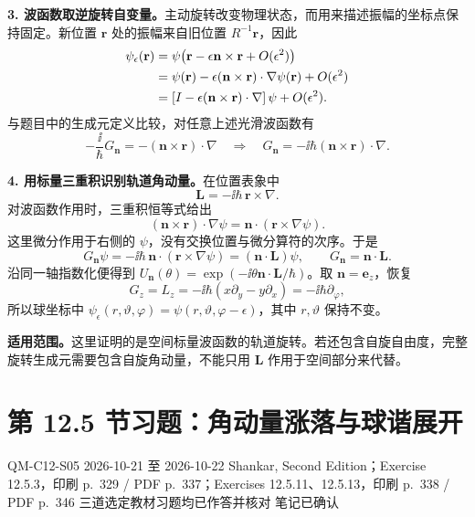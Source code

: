 \begin{checkedsolution}
\textbf{3. 波函数取逆旋转自变量。}主动旋转改变物理状态，而用来描述振幅的坐标点保持固定。新位置 $\mathbf r$ 处的振幅来自旧位置 $R^{-1}\mathbf r$，因此
\begin{align}
  \psi_\epsilon(\mathbf r)
  &=\psi\bigl(\mathbf r-\epsilon\mathbf n\times\mathbf r
      +O(\epsilon^2)\bigr)\notag\\
  &=\psi(\mathbf r)-\epsilon(\mathbf n\times\mathbf r)\cdot
      \nabla\psi(\mathbf r)+O(\epsilon^2)\notag\\
  &=\left[I-\epsilon(\mathbf n\times\mathbf r)\cdot\nabla\right]\psi
      +O(\epsilon^2).
\end{align}
与题目中的生成元定义比较，对任意上述光滑波函数有
\begin{equation}
  -\frac{\ii}{\hbar}G_{\mathbf n}
   =-(\mathbf n\times\mathbf r)\cdot\nabla
  \quad\Longrightarrow\quad
  G_{\mathbf n}=-\ii\hbar(\mathbf n\times\mathbf r)\cdot\nabla.
\end{equation}

\textbf{4. 用标量三重积识别轨道角动量。}在位置表象中
\begin{equation}
  \mathbf L=-\ii\hbar\,\mathbf r\times\nabla.
\end{equation}
对波函数作用时，三重积恒等式给出
\begin{equation}
  (\mathbf n\times\mathbf r)\cdot\nabla\psi
   =\mathbf n\cdot(\mathbf r\times\nabla\psi).
\end{equation}
这里微分作用于右侧的 $\psi$，没有交换位置与微分算符的次序。于是
\begin{equation}
  G_{\mathbf n}\psi
  =-\ii\hbar\,\mathbf n\cdot(\mathbf r\times\nabla\psi)
  =(\mathbf n\cdot\mathbf L)\psi,
  \qquad \boxed{G_{\mathbf n}=\mathbf n\cdot\mathbf L}.
\end{equation}
沿同一轴指数化便得到 $U_{\mathbf n}(\theta)=\exp(-\ii\theta\mathbf n\cdot\mathbf L/\hbar)$。取 $\mathbf n=\mathbf e_z$，恢复
\begin{equation}
  G_z=L_z=-\ii\hbar(x\partial_y-y\partial_x)
      =-\ii\hbar\partial_\varphi,
\end{equation}
所以球坐标中 $\psi_\epsilon(r,\vartheta,\varphi)=\psi(r,\vartheta,\varphi-\epsilon)$，其中 $r,\vartheta$ 保持不变。

\textbf{适用范围。}这里证明的是空间标量波函数的轨道旋转。若还包含自旋自由度，完整旋转生成元需要包含自旋角动量，不能只用 $\mathbf L$ 作用于空间部分来代替。
\end{checkedsolution}

\section{第 12.5 节习题：角动量涨落与球谐展开}
\label{exercises:QM-C12-S05}
\exercisemeta
  {QM-C12-S05}
  {2026-10-21 至 2026-10-22}
  {Shankar, Second Edition；Exercise 12.5.3，印刷 p.~329 / PDF p.~337；Exercises 12.5.11、12.5.13，印刷 p.~338 / PDF p.~346}
  {三道选定教材习题均已作答并核对}
  {笔记已确认}

